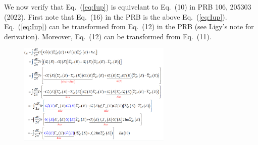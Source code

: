 \documentclass[aps,prb,superscriptaddress]{revtex4-2}
\begin{document}
We now verify that Eq.~(\ref{eq:Iup}) is equivelant to Eq.~(10) in PRB 106, 205303 (2022). First note that Eq.~(16) in the PRB is the above Eq.~(\ref{eq:Iup}). Eq.~(\ref{eq:Iup}) can be transformed from Eq.~(12) in the PRB (see Ligy's note for derivation). Moreover, Eq.~(12) can be transformed from Eq.~(11).
\begin{figure}[htp!]
\centering
\includegraphics[width=0.65\textwidth, height=0.5\textwidth]{figures/eq1.png}
\end{figure}
\end{document}
